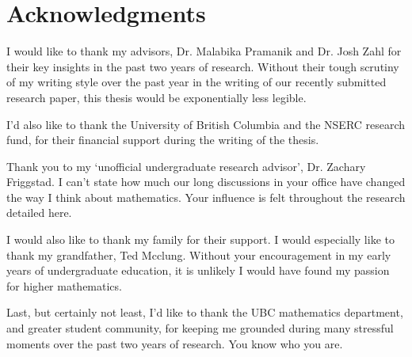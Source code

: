 
\chapter{Acknowledgments}

I would like to thank my advisors, Dr. Malabika Pramanik and Dr. Josh Zahl for their key insights in the past two years of research. Without their tough scrutiny of my writing style over the past year in the writing of our recently submitted research paper, this thesis would be exponentially less legible.

I'd also like to thank the University of British Columbia and the NSERC research fund, for their financial support during the writing of the thesis.

Thank you to my `unofficial undergraduate research advisor', Dr. Zachary Friggstad. I can't state how much our long discussions in your office have changed the way I think about mathematics. Your influence is felt throughout the research detailed here.

I would also like to thank my family for their support. I would especially like to thank my grandfather, Ted Mcclung. Without your encouragement in my early years of undergraduate education, it is unlikely I would have found my passion for higher mathematics.

Last, but certainly not least, I'd like to thank the UBC mathematics department, and greater student community, for keeping me grounded during many stressful moments over the past two years of research. You know who you are.